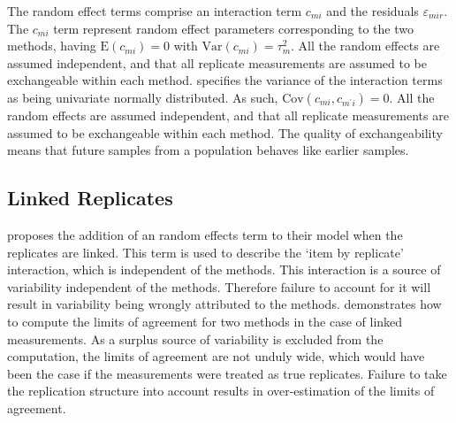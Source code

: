 \documentclass[12pt, a4paper]{report}
\theoremstyle{plain}
\theoremstyle{definition}
\theoremstyle{remark}
\begin{document}
	The random effect terms comprise an interaction term $c_{mi}$ and the residuals $\varepsilon_{mir}$. The $c_{mi}$ term represent random effect parameters corresponding to the two methods, having $\mathrm{E}(c_{mi})= 0$ with $\mathrm{Var}(c_{mi})=\tau^2_m$. All the random effects are assumed independent, and that all replicate measurements are assumed to be exchangeable within each method.
%	
\citet{BXC2008} specifies the variance of the interaction terms as being univariate normally distributed. As such, $\mathrm{Cov}(c_{mi}, c_{m^\prime i})= 0.$ All the random effects are assumed independent, and that all replicate measurements are assumed to be exchangeable within each method.
The quality of exchangeability means that future samples from a population behaves like earlier samples.	

	
\subsection{Linked Replicates}
	
\citet{BXC2008} proposes the addition of an random effects term to their model when the replicates are linked. This term is used to describe the `item by replicate' interaction, which is independent of the methods. This interaction is a source of variability independent of the methods. Therefore failure to account for it will result in variability being wrongly attributed to the methods. \citet{BXC2008} demonstrates how to compute the limits of agreement for two methods in the case of linked measurements. As a surplus source of variability is excluded from the computation, the limits of agreement are not unduly wide, which would have been the case if the measurements were treated as true replicates.
Failure to take the replication structure into account results in over-estimation of the limits of agreement.
	
\end{document}
